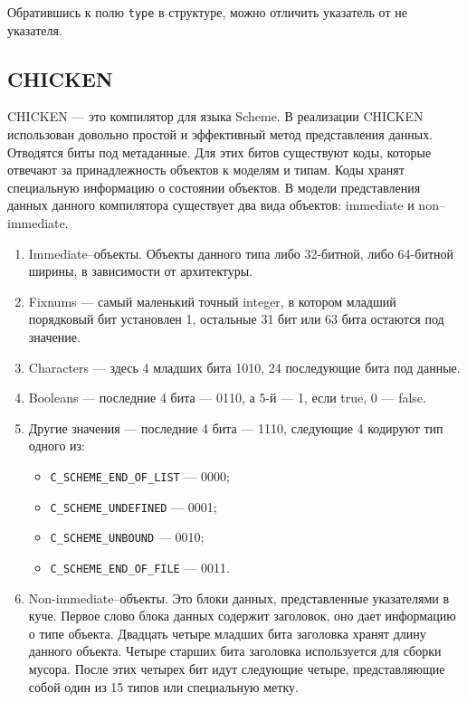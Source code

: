 Обратившись к полю \texttt{type} в структуре, можно отличить указатель от не указателя.

\subsection {CHICKEN}

CHICKEN --- это компилятор для языка Scheme.
В реализации CHIСKEN использован довольно простой и эффективный метод представления данных.
Отводятся биты под метаданные. Для этих битов существуют коды, которые отвечают за
принадлежность объектов к моделям и типам. Коды хранят специальную информацию о состоянии объектов.
В  модели представления данных данного компилятора
существует два вида объектов: immediate и non--immediate.

\begin{enumerate}
\item Immediate--объекты.
Объекты данного типа либо 32-битной, либо 64-битной ширины, в зависимости от архитектуры.
\item Fixnums --- самый маленький точный integer, в котором младший порядковый бит 
установлен 1, остальные 31 бит или 63 бита остаются под значение.
\item Characters --- здесь 4 младших бита 1010, 24 последующие бита под данные.
\item Booleans --- последние 4 бита --- 0110, а 5-й --- 1, если true, 0 --- false.
\item Другие значения --- последние 4 бита --- 1110, следующие 4 кодируют тип одного из:

\begin{itemize}
\item \lstinline{C_SCHEME_END_OF_LIST} --- 0000;
\item \lstinline{C_SCHEME_UNDEFINED} --- 0001;
\item \lstinline{C_SCHEME_UNBOUND} --- 0010;
\item \lstinline{C_SCHEME_END_OF_FILE} --- 0011.
\end{itemize}

\item Non-immediate--объекты.
Это блоки данных, представленные указателями в куче.
Первое слово блока данных содержит заголовок, оно дает информацию о типе объекта. 
Двадцать четыре младших бита заголовка хранят длину данного объекта.
Четыре старших бита заголовка используется для сборки 
мусора.
После этих четырех бит идут следующие четыре, представляющие собой один из 15 типов или специальную метку.
\end{enumerate}

